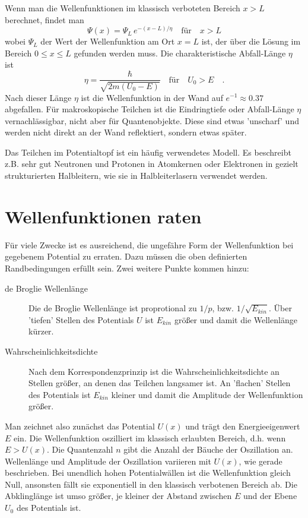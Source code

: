 Wenn man die Wellenfunktionen im klassisch verboteten Bereich $x > L$ berechnet, findet man
\begin{equation}
\Psi(x) = \Psi_L \, e^{- (x-L)/ \eta} \quad \text{für} \quad x > L
\end{equation}
wobei $\Psi_L$ der Wert der Wellenfunktion am Ort $x=L$ ist, der über die Lösung im Bereich $0 \le x \le L$ gefunden werden muss. Die charakteristische  Abfall-Länge $\eta$ ist
\begin{equation}
    \eta = \frac{\hbar}{\sqrt{2m ( U_0 - E)}} \quad \text{für} \quad U_0 > E \quad .
\end{equation}
Nach dieser Länge $\eta$ ist die Wellenfunktion in der Wand auf $e^{-1} \approx 0.37$ abgefallen. Für makroskopische Teilchen ist die Eindringtiefe oder Abfall-Länge $\eta$ vernachlässigbar, nicht aber für Quantenobjekte. Diese sind etwas 'unscharf' und werden nicht direkt an der Wand reflektiert, sondern etwas später.

Das Teilchen im Potentialtopf ist ein häufig verwendetes Modell. Es beschreibt z.B. sehr gut Neutronen und Protonen in Atomkernen oder Elektronen in gezielt strukturierten Halbleitern, wie sie in Halbleiterlasern verwendet werden.

\section{Wellenfunktionen raten}

Für viele Zwecke ist es ausreichend, die ungefähre Form der Wellenfunktion bei gegebenem Potential zu erraten. Dazu müssen die oben definierten Randbedingungen erfüllt sein. Zwei weitere Punkte kommen hinzu:
\begin{description}
    \item[de Broglie Wellenlänge] Die de Broglie Wellenlänge ist proprotional zu $1/p$, bzw. $1/\sqrt{E_{kin}}$. Über 'tiefen' Stellen des Potentials $U$ ist $E_{kin}$ größer und damit die Wellenlänge kürzer.
    \item[Wahrscheinlichkeitsdichte] Nach dem Korrespondenzprinzip ist die Wahrscheinlichkeitsdichte an Stellen größer, an denen das Teilchen langsamer ist. An 'flachen' Stellen des Potentials ist $E_{kin}$ kleiner und damit die Amplitude der Wellenfunktion größer.
\end{description}

Man zeichnet also zunächst das Potential $U(x)$ und trägt den Energieeigenwert $E$ ein. Die Wellenfunktion oszilliert im klassisch erlaubten Bereich, d.h. wenn $E > U(x)$. Die Quantenzahl $n$ gibt die Anzahl der Bäuche der Oszillation an. Wellenlänge und Amplitude der Oszillation variieren mit $U(x)$, wie gerade beschrieben. Bei unendlich hohen Potentialwällen ist die Wellenfunktion gleich Null, ansonsten fällt sie exponentiell in den klassisch verbotenen Bereich ab. Die Abklinglänge ist umso größer, je kleiner der Abstand zwischen $E$ und der Ebene $U_0$ des Potentials ist.


